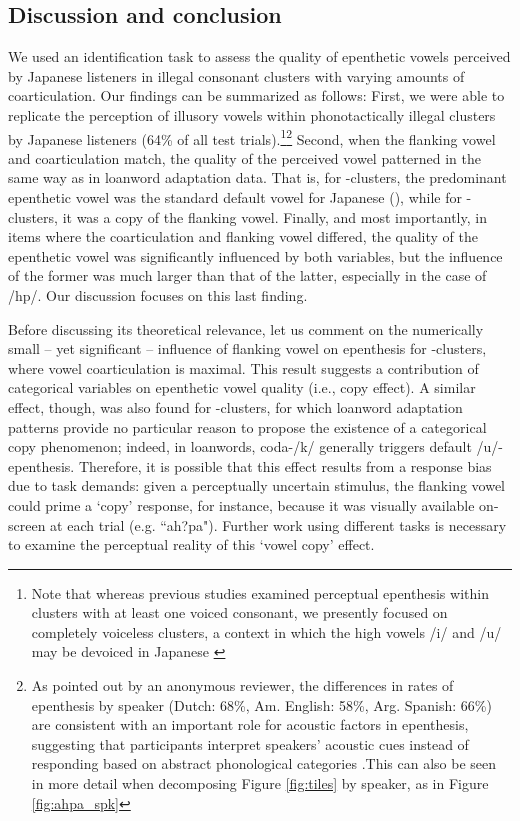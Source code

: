 \subsection{Discussion and conclusion}

We used an identification task to assess the quality of epenthetic vowels perceived by Japanese listeners in illegal consonant clusters with varying amounts of coarticulation. Our findings can be summarized as follows: First, we were able to replicate the perception of illusory vowels within phonotactically illegal clusters by Japanese listeners (64\% of all test trials).\footnote{Note that whereas previous studies examined perceptual epenthesis within clusters with at least one voiced consonant, we presently focused on completely voiceless clusters, a context in which the high vowels /i/ and /u/ may be devoiced in Japanese \cite{han1962, vance1987}}\footnote{As pointed out by an anonymous reviewer, the differences in rates of epenthesis by speaker (Dutch: 68\%, Am. English: 58\%, Arg. Spanish: 66\%) are consistent with an important role for acoustic factors in epenthesis, suggesting that participants interpret speakers' acoustic cues instead of responding based on abstract phonological categories \cite[cf.][]{wilson2014}.{\color{blue}This can also be seen in more detail when decomposing Figure \ref{fig:tiles} by speaker, as in Figure \ref{fig:ahpa_spk}}} %
Second, when the flanking vowel and coarticulation match, the quality of the perceived vowel patterned in the same way as in loanword adaptation data. That is, for -clusters, the predominant epenthetic vowel was the standard default vowel for Japanese (), while for -clusters, it was a copy of the flanking vowel. Finally, and most importantly, in items where the coarticulation and flanking vowel differed, the quality of the epenthetic vowel was significantly influenced by both variables, but the influence of the former was much larger than that of the latter, especially in the case of /hp/. Our discussion focuses on this last finding. 

Before discussing its theoretical relevance, let us comment on the numerically small -- yet significant -- influence of flanking vowel on epenthesis for -clusters, where vowel coarticulation is maximal. This result suggests a contribution of categorical variables on epenthetic vowel quality (i.e., copy effect). A similar effect, though, was also found for -clusters, for which loanword adaptation patterns provide no particular reason to propose the existence of a categorical copy phenomenon; indeed, in loanwords, coda-/k/ generally triggers default /u/-epenthesis. 
Therefore, it is possible that this effect results from a response bias due to task demands: given a perceptually uncertain stimulus, the flanking vowel could prime a `copy' response, for instance, because it was visually available on-screen at each trial (e.g. ``ah?pa"). Further work using different tasks is necessary to examine the perceptual reality of this `vowel copy' effect.

